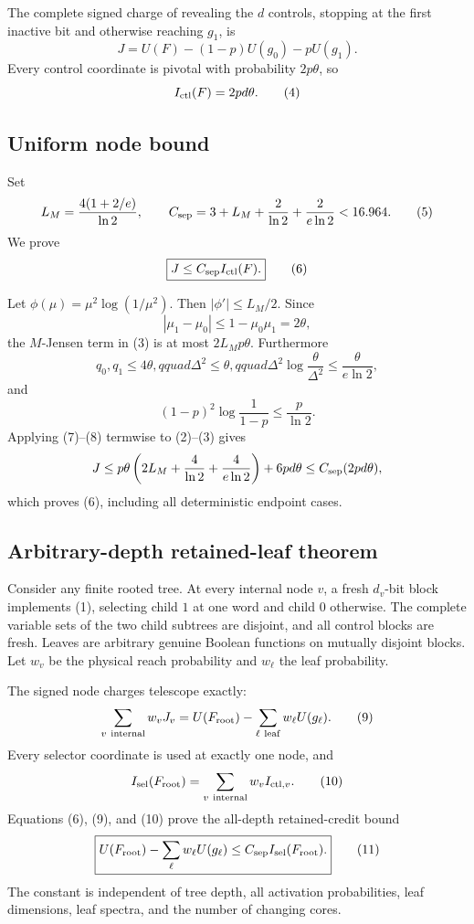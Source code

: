 The complete signed charge of revealing the $d$ controls, stopping at the
first inactive bit and otherwise reaching $g_1$, is
\[
 J=U(F)-(1-p)U(g_0)-pU(g_1).                                \tag{3}
\]
Every control coordinate is pivotal with probability $2p\theta$, so
\[
 I_{\rm ctl}(F)=2pd\theta.                                  \tag{4}
\]

\subsection*{Uniform node bound}

Set
\[
 L_M=\frac{4(1+2/e)}{\ln2},\qquad
 C_{\rm sep}=3+L_M+\frac2{\ln2}+\frac2{e\ln2}<16.964.       \tag{5}
\]
We prove
\[
 \boxed{J\le C_{\rm sep}I_{\rm ctl}(F).}                   \tag{6}
\]

Let $\phi(\mu)=\mu^2\log(1/\mu^2)$.  Then
$|\phi'|\le L_M/2$.  Since
\[
 |\mu_1-\mu_0|\le1-\mu_0\mu_1=2\theta,
\]
the $M$-Jensen term in (3) is at most $2L_Mp\theta$.
Furthermore
\[
q_0,q_1\le4\theta,qquad \Delta^2\le\theta,qquad
\Delta^2\log\frac{\theta}{\Delta^2}\le\frac{\theta}{e\ln2},\tag{7}
\]
and
\[
(1-p)^2\log\frac1{1-p}\le\frac p{\ln2}.                   \tag{8}
\]
Applying (7)--(8) termwise to (2)--(3) gives
\[
J\le
p\theta\left(2L_M+\frac4{\ln2}+\frac4{e\ln2}\right)
+6pd\theta
\le C_{\rm sep}(2pd\theta),
\]
which proves (6), including all deterministic endpoint cases.

\subsection*{Arbitrary-depth retained-leaf theorem}

Consider any finite rooted tree.  At every internal node $v$, a fresh
$d_v$-bit block implements (1), selecting child $1$ at one word and child
$0$ otherwise.  The complete variable sets of the two child subtrees are
disjoint, and all control blocks are fresh.  Leaves are arbitrary genuine
Boolean functions on mutually disjoint blocks.  Let $w_v$ be the physical
reach probability and $w_\ell$ the leaf probability.

The signed node charges telescope exactly:
\[
\sum_{v\ \mathrm{internal}}w_vJ_v
=U(F_{\rm root})-\sum_{\ell\ \mathrm{leaf}}w_\ell U(g_\ell).\tag{9}
\]
Every selector coordinate is used at exactly one node, and
\[
 I_{\rm sel}(F_{\rm root})
=\sum_{v\ \mathrm{internal}}w_v I_{{\rm ctl},v}.            \tag{10}
\]
Equations (6), (9), and (10) prove the all-depth retained-credit bound
\[
\boxed{
U(F_{\rm root})-\sum_\ell w_\ell U(g_\ell)
\le C_{\rm sep}I_{\rm sel}(F_{\rm root}).}                 \tag{11}
\]
The constant is independent of tree depth, all activation probabilities,
leaf dimensions, leaf spectra, and the number of changing cores.

